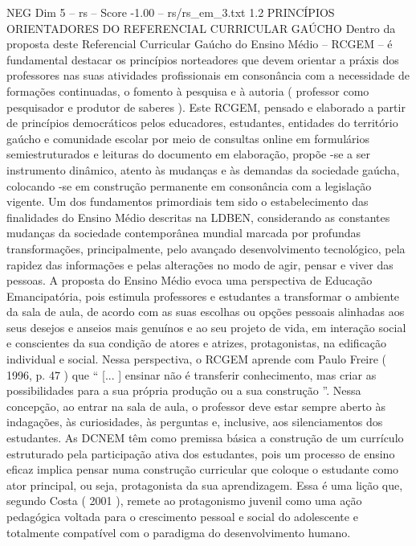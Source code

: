 \begin{textsample}{NEG Dim 5 – rs – Score -1.00 – rs/rs\_em\_3.txt}  \label{ex:f5_neg_028}
1.2 PRINCÍPIOS ORIENTADORES DO REFERENCIAL CURRICULAR GAÚCHO Dentro da proposta deste Referencial Curricular Gaúcho do Ensino Médio – RCGEM – é fundamental destacar os princípios norteadores que devem orientar a práxis dos professores nas suas atividades profissionais em consonância com a necessidade de formações continuadas, o fomento à pesquisa e à autoria ( professor como pesquisador e produtor de saberes ).
Este RCGEM, pensado e elaborado a partir de princípios democráticos pelos educadores, estudantes, entidades do território gaúcho e comunidade escolar por meio de consultas online em formulários semiestruturados e leituras do documento em elaboração, propõe -se a ser instrumento dinâmico, atento às mudanças e às demandas da sociedade gaúcha, colocando -se em construção permanente em consonância com a legislação vigente.
Um dos fundamentos primordiais tem sido o estabelecimento das finalidades do Ensino Médio descritas na LDBEN, considerando as constantes mudanças da sociedade contemporânea mundial marcada por profundas transformações, principalmente, pelo avançado desenvolvimento tecnológico, pela rapidez das informações e pelas alterações no modo de agir, pensar e viver das pessoas.
A proposta do Ensino Médio evoca uma perspectiva de Educação Emancipatória, pois estimula professores e estudantes a transformar o ambiente da sala de aula, de acordo com as suas escolhas ou opções pessoais alinhadas aos seus desejos e anseios mais genuínos e ao seu projeto de vida, em interação social e conscientes da sua condição de atores e atrizes, protagonistas, na edificação individual e social.
Nessa perspectiva, o RCGEM aprende com Paulo Freire ( 1996, p. 47 ) que “ [... ] ensinar não é transferir conhecimento, mas criar as possibilidades para a sua própria produção ou a sua construção ”.
Nessa concepção, ao entrar na sala de aula, o professor deve estar sempre aberto às indagações, às curiosidades, às perguntas e, inclusive, aos silenciamentos dos estudantes.
As DCNEM têm como premissa básica a construção de um currículo estruturado pela participação ativa dos estudantes, pois um processo de ensino eficaz implica pensar numa construção curricular que coloque o estudante como ator principal, ou seja, protagonista da sua aprendizagem.
Essa é uma lição que, segundo Costa ( 2001 ), remete ao protagonismo juvenil como uma ação pedagógica voltada para o crescimento pessoal e social do adolescente e totalmente compatível com o paradigma do desenvolvimento humano.

\end{textsample}
